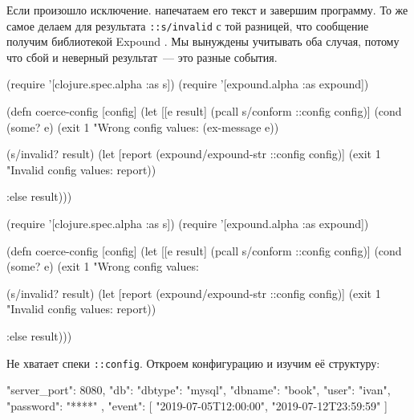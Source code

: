 Если произошло исключение. напечатаем его текст и завершим программу. То же
самое делаем для результата \verb|::s/invalid| с той разницей, что сообщение
получим библиотекой Expound . Мы вынуждены учитывать оба случая,
потому что сбой и неверный результат~--- это разные события.

\ifnarrow

\begin{english}
  \begin{clojure}
(require '[clojure.spec.alpha :as s])
(require '[expound.alpha :as expound])

(defn coerce-config [config]
  (let [[e result] (pcall s/conform
                     ::config config)]
    (cond
      (some? e)
      (exit 1 "Wrong config values: %
        (ex-message e))

      (s/invalid? result)
      (let [report (expound/expound-str
                     ::config config)]
        (exit 1
          "Invalid config values: %
          \newline report))

      :else result)))
  \end{clojure}
\end{english}

\else

\begin{english}
  \begin{clojure}
(require '[clojure.spec.alpha :as s])
(require '[expound.alpha :as expound])

(defn coerce-config [config]
  (let [[e result] (pcall s/conform ::config config)]
    (cond
      (some? e)
      (exit 1 "Wrong config values: %

      (s/invalid? result)
      (let [report (expound/expound-str ::config config)]
    (exit 1 "Invalid config values: %
            \newline report))

      :else result)))
  \end{clojure}
\end{english}

\fi

Не хватает спеки \verb|::config|. Откроем конфигурацию и изучим её структуру:


\begin{english}
  \begin{json}
{
    "server_port": 8080,
    "db": {
        "dbtype":   "mysql",
        "dbname":   "book",
        "user":     "ivan",
        "password": "****"
    },
    "event": [
        "2019-07-05T12:00:00",
        "2019-07-12T23:59:59"
    ]
}
  \end{json}
\end{english}

